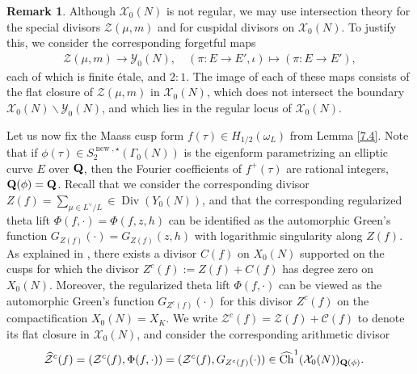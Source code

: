 \documentclass{amsart}
\theoremstyle{definition}
\theoremstyle{definition}
\theoremstyle{definition}
\newtheorem{remark}[theorem]{Remark}
\begin{document}
\begin{remark} Although $\mathcal{X}_0(N)$ is not regular, we may use intersection theory for the special divisors 
$\mathcal{Z}(\mu, m)$ and for cuspidal divisors on $\mathcal{X}_0(N)$. To justify this, we consider the corresponding forgetful maps
\begin{align*} \mathcal{Z}(\mu, m) \longrightarrow \mathcal{Y}_0(N), \quad (\pi: E \rightarrow E', \iota) \longmapsto (\pi: E \rightarrow E'), \end{align*}
each of which is finite \'etale, and $2:1$. The image of each of these maps consists of the flat closure of $\mathcal{Z}(\mu, m)$ in $\mathcal{X}_0(N)$, 
which does not intersect the boundary $\mathcal{X}_0(N) \backslash \mathcal{Y}_0(N)$, and which lies in the regular locus of $\mathcal{X}_0(N)$. \end{remark}

Let us now fix the Maass cusp form $f(\tau) \in H_{1/2}(\omega_L)$ from Lemma \ref{7.4}. 
Note that if $\phi(\tau) \in S_2^{\operatorname{new}, \star}(\Gamma_0(N))$ 
is the eigenform parametrizing an elliptic curve $E$ over ${\bf{Q}}$, 
then the Fourier coefficients of $f^+(\tau)$ are rational integers, ${\bf{Q}}(\phi) = {\bf{Q}}$. 
Recall that we consider the corresponding divisor $Z(f) = \sum\limits_{\mu \in L^{\vee}/L} \in \operatorname{Div}(Y_0(N))$,
and that the corresponding regularized theta lift $\Phi(f, \cdot) = \Phi(f, z, h)$ can be identified as the automorphic Green's function
$G_{Z(f)}(\cdot) = G_{Z(f)}(z, h)$ with logarithmic singularity along $Z(f)$. 
As explained in \cite[$\S$ 7.3]{BY}, there exists a divisor $C(f)$ on $X_0(N)$ supported on the cusps for which the divisor $Z^c(f) := Z(f) + C(f)$
has degree zero on $X_0(N)$. Moreover, the regularized theta lift $\Phi(f, \cdot)$
can be viewed as the automorphic Green's function $G_{Z^c(f)}(\cdot)$ for this divisor $Z^c(f)$ on the compactification $X_0(N) = X_K$.
We write $\mathcal{Z}^c(f) = \mathcal{Z}(f) + \mathcal{C}(f)$ to denote its flat closure in $\mathcal{X}_0(N)$, and consider the corresponding arithmetic divisor 
\begin{align*} \widehat{\mathcal{Z}}^c(f) &= ( \mathcal{Z}^c(f), \Phi(f, \cdot) ) 
= (\mathcal{Z}^c(f), G_{Z^c(f)}(\cdot)) \in \widehat{\operatorname{Ch}}^1(\mathcal{X}_0(N))_{ {\bf{Q}}(\phi) }. \end{align*}
\end{document}
